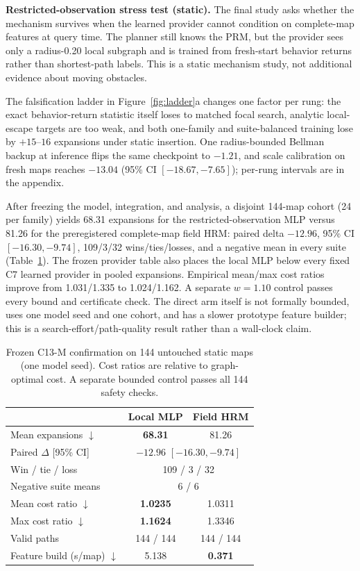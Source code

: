 \documentclass[letterpaper]{article} %
\newcommand{\stage}[1]{\textsc{#1}}
\begin{document}
\textbf{Restricted-observation stress test (static).} The final study asks whether the mechanism survives when the learned provider cannot condition on complete-map features at query time. The planner still knows the PRM, but the provider sees only a radius-0.20 local subgraph and is trained from fresh-start behavior returns rather than shortest-path labels. This is a static mechanism study, not additional evidence about moving obstacles.

The falsification ladder in Figure~\ref{fig:ladder}a changes one factor per rung: the exact behavior-return statistic itself loses to matched focal search, analytic local-escape targets are too weak, and both one-family and suite-balanced training lose by $+15$--$16$ expansions under static insertion. One radius-bounded Bellman backup at inference flips the same checkpoint to $-1.21$, and scale calibration on fresh maps reaches $-13.04$ (95\% CI $[-18.67,-7.65]$); per-rung intervals are in the appendix.

After freezing the model, integration, and analysis, a disjoint 144-map cohort (24 per family) yields 68.31 expansions for the restricted-observation MLP versus 81.26 for the preregistered complete-map field HRM: paired delta $-12.96$, 95\% CI $[-16.30,-9.74]$, 109/3/32 wins/ties/losses, and a negative mean in every suite (Table~\ref{tab:c13m}). The frozen provider table also places the local MLP below every fixed \stage{C7} learned provider in pooled expansions. Empirical mean/max cost ratios improve from 1.031/1.335 to 1.024/1.162. A separate $w=1.10$ control passes every bound and certificate check. The direct arm itself is not formally bounded, uses one model seed and one cohort, and has a slower prototype feature builder; this is a search-effort/path-quality result rather than a wall-clock claim.

\begin{table}[t]
\centering
\small
\begin{tabular}{lcc}
\toprule
 & Local MLP & Field HRM \\
\midrule
Mean expansions $\downarrow$ & \textbf{68.31} & 81.26 \\
Paired $\Delta$ [95\% CI] & \multicolumn{2}{c}{$-12.96$ $[-16.30,-9.74]$} \\
Win / tie / loss & \multicolumn{2}{c}{109 / 3 / 32} \\
Negative suite means & \multicolumn{2}{c}{6 / 6} \\
Mean cost ratio $\downarrow$ & \textbf{1.0235} & 1.0311 \\
Max cost ratio $\downarrow$ & \textbf{1.1624} & 1.3346 \\
Valid paths & 144 / 144 & 144 / 144 \\
Feature build (s/map) $\downarrow$ & 5.138 & \textbf{0.371} \\
\bottomrule
\end{tabular}
\caption{Frozen \stage{C13-M} confirmation on 144 untouched static maps (one model seed). Cost ratios are relative to graph-optimal cost. A separate bounded control passes all 144 safety checks.}
\label{tab:c13m}
\end{table}
\end{document}
